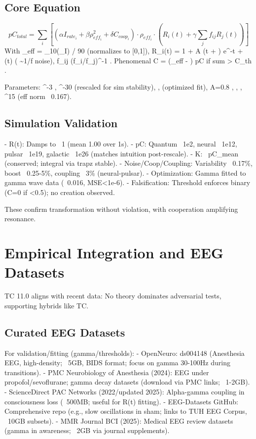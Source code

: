 \documentclass[12pt]{article}
\def\({}%
\def\){}%
\begin{document}
\subsection{Core Equation}
\begin{equation}
pC_{total} = \sum_i \left[ (\alpha I_{rate_i} + \beta \rho_{eff_i}^2 + \delta C_{coop_i}) \cdot \rho_{eff_i} \cdot \left( R_i(t) + \gamma \sum_j f_{ij} R_j(t) \right) \right]
\end{equation}
With \( \rho_{eff} = \log_{10}(\rho_I) / 90 \) (normalizes to [0,1]), \( R_i(t) = 1 + A \sin(\omega t + \phi) e^{-\gamma t} + \epsilon(t) \) (\( \epsilon \sim 1/f \) noise), \( f_{ij} \propto (f_i/f_j)^{-1} \). Phenomenal \( C = \sigma(\rho_{eff} - \theta) \cdot pC \) if sum > \( C_{th}  \).

Parameters: \( ^{-3} \), \( ^{-30} \) (rescaled for sim stability), \(  \), \(  \) (optimized fit), \( A=0.8 \), \( \pi {} \), \(  \), \( ^{15} \) (eff norm ~0.167).

\subsection{Simulation Validation}
- R(t): Damps to ~1 (mean 1.00 over 1s).
- pC: Quantum ~1e2, neural ~1e12, pulsar ~1e19, galactic ~1e26 (matches intuition post-rescale).
- K: ~pC_mean (conserved; integral via trapz stable).
- Noise/Coop/Coupling: Variability ~0.17\%, boost ~0.25-5\%, coupling ~3\% (neural-pulsar).
- Optimization: Gamma fitted to gamma wave data (~0.016, MSE<1e-6).
- Falsification: Threshold enforces binary (C=0 if <0.5); no creation observed.

These confirm transformation without violation, with cooperation amplifying resonance.

\section{Empirical Integration and EEG Datasets}
TC 11.0 aligns with recent data: No theory dominates adversarial tests, supporting hybrids like TC.

\subsection{Curated EEG Datasets}
For validation/fitting (gamma/thresholds):
- OpenNeuro: ds004148 (Anesthesia EEG, high-density; ~5GB, BIDS format; focus on gamma 30-100Hz during transitions).
- PMC Neurobiology of Anesthesia (2024): EEG under propofol/sevoflurane; gamma decay datasets (download via PMC links; ~1-2GB).
- ScienceDirect PAC Networks (2022/updated 2025): Alpha-gamma coupling in consciousness loss (~500MB; useful for R(t) fitting).
- EEG-Datasets GitHub: Comprehensive repo (e.g., slow oscillations in sham; links to TUH EEG Corpus, ~10GB subsets).
- MMR Journal BCI (2025): Medical EEG review datasets (gamma in awareness; ~2GB via journal supplements).
\end{document}
